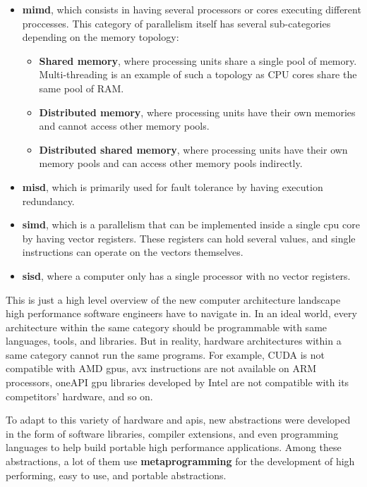 \documentclass[main]{subfiles}
\begin{document}
\begin{itemize}
\item
\textbf{\gls{mimd}}, which consists in having several processors or cores
executing different proccesses. This category of parallelism itself has several
sub-categories depending on the memory topology:

  \begin{itemize}
  \item \textbf{Shared memory}, where processing units share a single
  pool of memory. Multi-threading is an example of such a topology as
  CPU cores share the same pool of RAM.
  \item \textbf{Distributed memory}, where processing units have their own
  memories and cannot access other memory pools.
  \item \textbf{Distributed shared memory}, where processing units have their
  own memory pools and can access other memory pools indirectly.
  \end{itemize}

\item
\textbf{\gls{misd}}, which is primarily used for fault tolerance by having
execution redundancy.

\item
\textbf{\gls{simd}}, which is a parallelism that can be implemented inside
a single \gls{cpu} core by having vector registers. These registers can hold
several values, and single instructions can operate on the vectors themselves.

\item
\textbf{\gls{sisd}}, where a computer only has a single processor with no
vector registers.

\end{itemize}


This is just a high level overview of the new computer architecture landscape
high performance software engineers have to navigate in.
In an ideal world, every architecture within the same category
should be programmable with same languages, tools, and libraries.
But in reality, hardware architectures within a same category
cannot run the same programs.
For example, CUDA is not compatible with AMD \glspl{gpu}, \gls{avx} instructions
are not available on ARM processors, oneAPI \gls{gpu} libraries developed by
Intel are not compatible with its competitors' hardware, and so on.

To adapt to this variety of hardware and \glspl{api}, new abstractions
were developed in the form of software libraries, compiler extensions,
and even programming languages to help build portable high performance
applications.
Among these abstractions, a lot of them use \textbf{metaprogramming} for the
development of high performing, easy to use, and portable abstractions.
\end{document}
